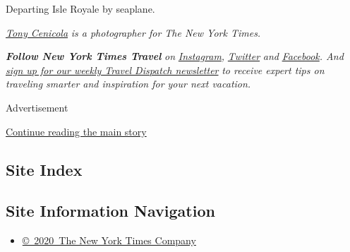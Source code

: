 Departing Isle Royale by seaplane.

\href{https://www.nytimes3xbfgragh.onion/by/tony-cenicola}{\emph{Tony
Cenicola}} \emph{is a photographer for The New York Times.}

\emph{\textbf{Follow New York Times Travel}} \emph{on}
\href{https://www.instagram.com/nytimestravel/}{\emph{Instagram}}\emph{,}
\href{https://twitter.com/nytimestravel}{\emph{Twitter}} \emph{and}
\href{https://www.facebookcorewwwi.onion/nytimestravel/}{\emph{Facebook}}\emph{.
And}
\href{https://www.nytimes3xbfgragh.onion/newsletters/traveldispatch}{\emph{sign
up for our weekly Travel Dispatch newsletter}} \emph{to receive expert
tips on traveling smarter and inspiration for your next vacation.}

Advertisement

\protect\hyperlink{after-bottom}{Continue reading the main story}

\hypertarget{site-index}{%
\subsection{Site Index}\label{site-index}}

\hypertarget{site-information-navigation}{%
\subsection{Site Information
Navigation}\label{site-information-navigation}}

\begin{itemize}
\tightlist
\item
  \href{https://help.nytimes3xbfgragh.onion/hc/en-us/articles/115014792127-Copyright-notice}{©~2020~The
  New York Times Company}
\end{itemize}

